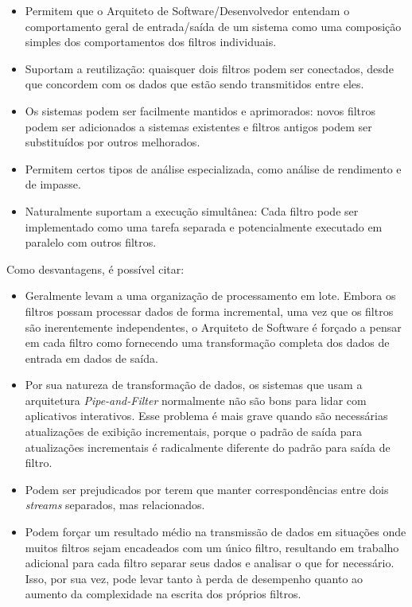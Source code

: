 \documentclass[portugues]{ic-tese}
\begin{document}
\begin{itemize}
\item Permitem que o Arquiteto de Software/Desenvolvedor entendam o comportamento geral de entrada/saída de um sistema como uma composição simples dos comportamentos dos filtros individuais.
\item Suportam a reutilização: quaisquer dois filtros podem ser conectados, desde que concordem com os dados que estão sendo transmitidos entre eles. 
\item Os sistemas podem ser facilmente mantidos e aprimorados: novos filtros podem ser adicionados a sistemas existentes e filtros antigos podem ser substituídos por outros melhorados.
\item Permitem certos tipos de análise especializada, como análise de rendimento e de impasse.
\item Naturalmente suportam a execução simultânea: Cada filtro pode ser implementado como uma tarefa separada e potencialmente executado em paralelo com outros filtros.
\end{itemize}

Como desvantagens, é possível citar:

\begin{itemize}
\item Geralmente levam a uma organização de processamento em lote. Embora os filtros possam processar dados de forma incremental, uma vez que os filtros são inerentemente independentes, o Arquiteto de Software é forçado a pensar em cada filtro como fornecendo uma transformação completa dos dados de entrada em dados de saída. 
\item Por sua natureza de transformação de dados, os sistemas que usam a arquitetura \textit{Pipe-and-Filter} normalmente não são bons para lidar com aplicativos interativos. Esse problema é mais grave quando são necessárias atualizações de exibição incrementais, porque o padrão de saída para atualizações incrementais é radicalmente diferente do padrão para saída de filtro.
\item Podem ser prejudicados por terem que manter correspondências entre dois \textit{streams} separados, mas relacionados. 
\item Podem forçar um resultado médio na transmissão de dados em situações onde muitos filtros sejam encadeados com um único filtro, resultando em trabalho adicional para cada filtro separar seus dados e analisar o que for necessário. Isso, por sua vez, pode levar tanto à perda de desempenho quanto ao aumento da complexidade na escrita dos próprios filtros.
\end{itemize}
\end{document}
